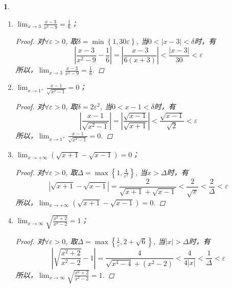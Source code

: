 \documentclass[utf8]{book}
\newtheorem{example}{}[section]             %
\begin{document}
\begin{example}
\begin{enumerate}
\item $\displaystyle\lim_{x\to 3}\frac{x-3}{x^2-9} = \frac{1}{6}$；
\begin{proof}对$\forall \varepsilon > 0$, 取$\delta=\min\left\{1, 30\varepsilon\right\}$, 当$0<\left|x-3\right| < \delta$时，有
$$\left|\frac{x-3}{x^2-9} - \frac{1}{6}\right| =\left|\frac{x-3}{6(x+3)}\right| <\frac{\left|x-3\right|}{30} < \varepsilon$$
所以，$\displaystyle\lim_{x\to 3}\frac{x-3}{x^2-9} = \frac{1}{6}$.
\end{proof}
\item $\displaystyle\lim_{x\to 1^{+}}\frac{x-1}{\sqrt{x^2-1}} = 0$；
\begin{proof}对$\forall \varepsilon > 0$, 取$\delta=2\varepsilon^2$, 当$0< x-1<\delta$时，有
$$\left|\frac{x-1}{\sqrt{x^2-1}}\right| =\left|\frac{\sqrt{x-1}}{\sqrt{x+1}}\right|<\frac{\sqrt{x-1}}{\sqrt{2}}<\varepsilon$$
所以，$\displaystyle\lim_{x\to 1^{+}}\frac{x-1}{\sqrt{x^2-1}} = 0$.
\end{proof}
\item $\displaystyle\lim_{x\to +\infty}(\sqrt{x+1}-\sqrt{x-1}) = 0$；
\begin{proof}对$\forall \varepsilon > 0$, 取$\Delta = \max\left\{1, \frac{4}{\varepsilon^2}\right\}$, 当$x > \Delta$时，有
$$\left|\sqrt{x+1}-\sqrt{x-1}\right| = \frac{2}{\sqrt{x+1}+\sqrt{x-1}}<\frac{2}{\sqrt{x}} < \frac{2}{\Delta} < \varepsilon$$
所以，$\displaystyle\lim_{x\to +\infty}(\sqrt{x+1}-\sqrt{x-1}) = 0$.
\end{proof}
\item $\displaystyle\lim_{x\to \infty}\sqrt{\frac{x^2+2}{x^2-2}}= 1$；
\begin{proof}对$\forall \varepsilon > 0$, 取$\Delta = \max\left\{\frac{1}{\varepsilon}, 2+ \sqrt{6}\right\}$, 当$|x| > \Delta$时，有
$$\left|\sqrt{\frac{x^2+2}{x^2-2}}- 1\right| = \frac{4}{\sqrt{x^4-4} +(x^2 - 2)}<\frac{4}{4|x|}<\frac{1}{\Delta}<\varepsilon$$
所以，$\displaystyle\lim_{x\to \infty}\sqrt{\frac{x^2+2}{x^2-2}}= 1$.
\end{proof}
\end{enumerate}
\end{example}
\end{document}
